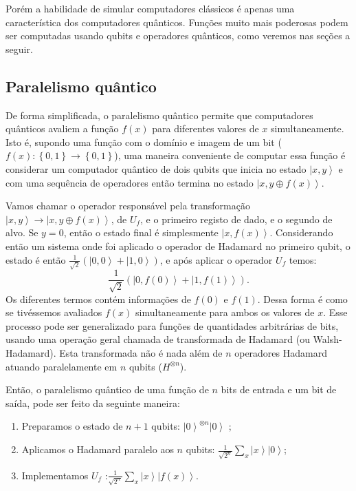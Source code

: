 Porém a habilidade de simular computadores clássicos é apenas uma característica dos computadores quânticos. Funções muito mais poderosas podem ser computadas usando qubits e operadores quânticos, como veremos nas seções a seguir.


\subsection{Paralelismo quântico}

De forma simplificada, o paralelismo quântico permite que computadores quânticos avaliem a função $f\left(x\right)$ para diferentes valores de $x$ simultaneamente. Isto é, supondo uma função com o domínio e imagem de um bit ( $f\left(x\right):\left\{ 0,1\right\} \rightarrow\left\{ 0,1\right\} $), uma maneira conveniente de computar essa função é considerar um computador quântico de dois qubits que inicia no estado $\left|x,y\right\rangle $ e com uma sequência de operadores então termina no  estado $\left|x,y\oplus f\left(x\right)\right\rangle $.

Vamos chamar o operador responsável pela transformação $\left|x,y\right\rangle \rightarrow\left|x,y\oplus f\left(x\right)\right\rangle $, de $U_{f}$, e o primeiro registo de dado, e o segundo de alvo. Se $y=0$, então o estado final é simplesmente $\left|x,f\left(x\right)\right\rangle $.  Considerando então um sistema onde foi aplicado o operador de Hadamard no primeiro qubit, o estado é então $
\frac{1}{\sqrt{2}}\left(\left|0,0\right\rangle +\left|1,0\right\rangle \right)
$, e após aplicar o operador $U_{f}$ temos:
\begin{equation}
\frac{1}{\sqrt{2}}\left(\left|0,f\left(0\right)\right\rangle +\left|1,f\left(1\right)\right\rangle \right)
. \end{equation}
Os diferentes termos contém informações de $f\left(0\right)$ e $f\left(1\right)$. Dessa forma é como se tivéssemos avaliados $f\left(x\right)$ simultaneamente para ambos os valores de $x$. Esse processo pode ser generalizado para funções de quantidades arbitrárias de bits, usando uma operação geral chamada de transformada de Hadamard (ou Walsh-Hadamard). Esta transformada não é nada além de $n$ operadores Hadamard atuando paralelamente em $n$ qubits ($H^{\otimes n}$).  

Então, o paralelismo quântico de uma função de $n$ bits de entrada e um bit de saída, pode ser feito da seguinte maneira: 
\begin{enumerate}
\item Preparamos o estado de $n+1$ qubits: $\left|0\right\rangle ^{\otimes n}\left|0\right\rangle $ ;
\item Aplicamos o Hadamard paralelo aos $n$ qubits: $\frac{1}{\sqrt{2^{n}}}\sum_{x}\left|x\right\rangle \left|0\right\rangle $;
\item Implementamos $U_{f}$ :$\frac{1}{\sqrt{2^{n}}}\sum_{x}\left|x\right\rangle \left|f\left(x\right)\right\rangle $.
\end{enumerate}

